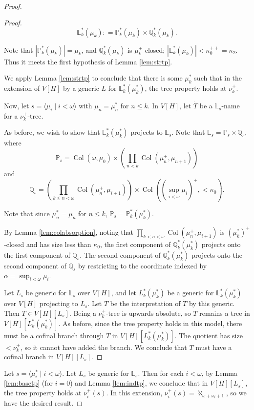 \documentclass[psamsfonts]{amsart}
\theoremstyle{definition}
\newcommand{\defeq}{\mathrel{\mathop:}=}
\newcommand{\Q}{\mathbb{Q}}
\newcommand{\PP}{\mathbb{P}}
\newcommand{\LL}{\mathbb{L}}
\newcommand{\ka}{\kappa}
\newcommand{\w}{\omega}
\DeclareMathOperator{\Coll}{Col}
\numberwithin{equation}{section}
\begin{document}
\begin{proof}
\begin{proof}
		\[\LL^*_k(\mu_k) \defeq \PP^*_k(\mu_k) \times \Q^*_k(\mu_k).\]
		
		Note that $|\PP^*_{k}(\mu_k)| = \mu_k$, and $\Q^*_k(\mu_k)$ is $\mu_k^+$-closed; $|\LL^*_k(\mu_k)| < \ka_0^{++} = \ka_2$. Thus it meets the first hypothesis of Lemma \ref{lem:strtp}.
		
		We apply Lemma \ref{lem:strtp} to conclude that there is some $\mu^*_k$ such that in the extension of $V[H]$ by a generic $L$ for $\LL^*_k(\mu^*_k)$, the tree property holds at $\nu_k^+$.
		
		Now, let $s = \langle \mu_i \mid i<\w\rangle$ with $\mu_n = \mu_n^*$ for $n \leq k$. In $V[H]$, let $\dot{T}$ be a $\LL_s$-name for a $\nu_k^+$-tree.
		
		As before, we wish to show that $\LL^*_k(\mu^*_k)$ projects to $\LL_s$. Note that $\LL_s = \PP_s \times \Q_s$, where
		\[\PP_s = \Coll(\w, \mu_0) \times \left(\prod_{n<k} \Coll(\mu_{n}^+, \mu_{n+1})\right)\]
		and
		\[\Q_s = \left(\prod_{k\leq n<\w} \Coll(\mu_{n}^+, \mu_{i+1})\right)\times \Coll\left((\sup_{i<\w}\mu_i)^+, <\ka_0\right).\]
		
		Note that since $\mu^*_n = \mu_n$ for $n \leq k$, $\PP_s = \PP^*_k(\mu^*_k)$.
		
		By Lemma \ref{lem:colabsorption}, noting that $\prod_{k<n<\w} \Coll(\mu_{n}^+, \mu_{i+1})$ is $(\mu^*_k)^+$-closed and has size less than $\ka_0$, the first component of $\Q^*_k(\mu^*_k)$ projects onto the first component of $\Q_s$. The second component of $\Q_k^*(\mu^*_k)$ projects onto the second component of $\Q_s$ by restricting to the coordinate indexed by $\alpha = \sup_{i<\w}\mu_i$.
		
		Let $L_s$ be generic for $\LL_s$ over $V[H]$, and let $L_k^*(\mu_k^*)$ be a generic for $\LL^*_k(\mu^*_k)$ over $V[H]$ projecting to $L_s$. Let $T$ be the interpretation of $\dot{T}$ by this generic. Then $T \in V[H][L_s]$. Being a $\nu_k^+$-tree is upwards absolute, so $T$ remains a tree in $V[H][L^*_k(\mu^*_k)]$. As before, since the tree property holds in this model, there must be a cofinal branch through $T$ in $V[H][L^*_k(\mu^*_k)]$. The quotient has size $<\nu_k^+$, so it cannot have added the branch. We conclude that $T$ must have a cofinal branch in $V[H][L_s]$.
	\end{proof}

	Let $s = \langle \mu_i^* \mid i < \w\rangle$. Let $L_s$ be generic for $\LL_s$. Then for each $i < \w$, by Lemma \ref{lem:basetp} (for $i=0$) and Lemma \ref{lem:indtp}, we conclude that in $V[H][L_s]$, the tree property holds at $\nu_i^+(s)$. In this extension, $\nu_i^+(s) = \aleph_{\w+\w_i+1}$, so we have the desired result.
\end{proof}
\end{document}
